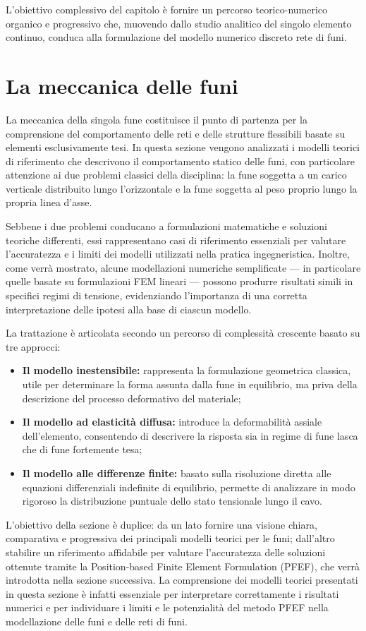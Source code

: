 L'obiettivo complessivo del capitolo è fornire un percorso teorico-numerico organico e progressivo che, muovendo dallo studio analitico del singolo elemento continuo, conduca alla formulazione del modello numerico discreto rete di funi.

\section{La meccanica delle funi}
La meccanica della singola fune costituisce il punto di partenza per la comprensione del comportamento delle reti e delle strutture flessibili basate su elementi esclusivamente tesi. In questa sezione vengono analizzati i modelli teorici di riferimento che descrivono il comportamento statico delle funi, con particolare attenzione ai due problemi classici della disciplina: la fune soggetta a un carico verticale distribuito lungo l'orizzontale e la fune soggetta al peso proprio lungo la propria linea d'asse.

Sebbene i due problemi conducano a formulazioni matematiche e soluzioni teoriche differenti, essi rappresentano casi di riferimento essenziali per valutare l'accuratezza e i limiti dei modelli utilizzati nella pratica ingegneristica. Inoltre, come verrà mostrato, alcune modellazioni numeriche semplificate — in particolare quelle basate su formulazioni FEM lineari — possono produrre risultati simili in specifici regimi di tensione, evidenziando l'importanza di una corretta interpretazione delle ipotesi alla base di ciascun modello.

La trattazione è articolata secondo un percorso di complessità crescente basato su tre approcci:
\begin{itemize}
   \item \textbf{Il modello inestensibile:} rappresenta la formulazione geometrica classica, utile per determinare la forma assunta dalla fune in equilibrio, ma priva della descrizione del processo deformativo del materiale;
   \item \textbf{Il modello ad elasticità diffusa:} introduce la deformabilità assiale dell'elemento, consentendo di descrivere la risposta sia in regime di fune lasca che di fune fortemente tesa;
   \item \textbf{Il modello alle differenze finite:} basato sulla risoluzione diretta alle equazioni differenziali indefinite di equilibrio, permette di analizzare in modo rigoroso la distribuzione puntuale dello stato tensionale lungo il cavo. 
\end{itemize}
L'obiettivo della sezione è duplice: da un lato fornire una visione chiara, comparativa e progressiva dei principali modelli teorici per le funi; dall'altro stabilire un riferimento affidabile per valutare l'accuratezza delle soluzioni ottenute tramite la Position-based Finite Element Formulation (PFEF), che verrà introdotta nella sezione successiva. La comprensione dei modelli teorici presentati in questa sezione è infatti essenziale per interpretare correttamente i risultati numerici e per individuare i limiti e le potenzialità del metodo PFEF nella modellazione delle funi e delle reti di funi.

